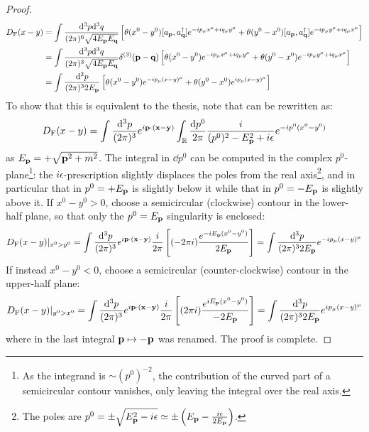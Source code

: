 \begin{proofbox}
\begin{proof}
    \begin{equation*}
      \begin{split}
        D_\text{F}(x-y)
        & = \int \frac{\mathrm{d}^3p \mathrm{d}^3q}{(2\pi)^6 \sqrt{4E_{\mathbf{p}}E_{\mathbf{q}}}} \left[ \theta(x^0 - y^0) [a_{\mathbf{p}} , a^\dagger_{\mathbf{q}}] e^{-i p_\mu x^\mu + i q_\mu y^\mu} + \theta(y^0 - x^0) [a_{\mathbf{p}} , a^\dagger_{\mathbf{q}}] e^{-i p_\mu y^\mu + i q_\mu x^\mu} \right] \\
        & = \int \frac{\mathrm{d}^3p \mathrm{d}^3q}{(2\pi)^3 \sqrt{4E_{\mathbf{p}}E_{\mathbf{q}}}} \delta^{(3)}(\mathbf{p} - \mathbf{q}) \left[ \theta(x^0 - y^0) e^{-i p_\mu x^\mu + i q_\mu y^\mu} + \theta(y^0 - x^0) e^{-i p_\mu y^\mu + i q_\mu x^\mu} \right] \\
        & = \int \frac{\mathrm{d}^3p}{(2\pi)^3 2E_{\mathbf{p}}} \left[ \theta(x^0 - y^0) e^{-i p_\mu (x-y)^\mu} + \theta(y^0 - x^0) e^{i p_\mu (x-y)^\mu} \right]
      \end{split}
    \end{equation*}
    To show that this is equivalent to the thesis, note that  can be rewritten as:
    \begin{equation*}
      D_\text{F}(x-y) = \int \frac{\mathrm{d}^3p}{(2\pi)^3} e^{i \mathbf{p} \cdot (\mathbf{x} - \mathbf{y})} \int_{\mathbb{R}} \frac{\mathrm{d} p^0}{2\pi} \frac{i}{(p^0)^2 - E_{\mathbf{p}}^2 + i\epsilon} e^{-i p^0 (x^0 - y^0)}
    \end{equation*}
    as $ E_{\mathbf{p}} = + \sqrt{\mathbf{p}^2 + m^2} $. The integral in $ \dd p^0 $ can be computed in the complex $ p^0 $-plane\footnote{As the integrand is $ \sim (p^0)^{-2} $, the contribution of the curved part of a semicircular contour vanishes, only leaving the integral over the real axis.}: the $ i\epsilon $-prescription slightly displaces the poles from the real axis\footnote{The poles are $ p^0 = \pm \sqrt{E_{\mathbf{p}}^2 - i\epsilon} \simeq \pm \left( E_{\mathbf{p}} - \frac{i\epsilon}{2E_{\mathbf{p}}} \right) $.}, and in particular that in $ p^0 = + E_{\mathbf{p}} $ is slightly below it while that in $ p^0 = - E_{\mathbf{p}} $ is slightly above it. If $ x^0 - y^0 > 0 $, choose a semicircular (clockwise) contour in the lower-half plane, so that only the $ p^0 = E_{\mathbf{p}} $ singularity is enclosed:
    \begin{equation*}
      D_\text{F}(x-y)\vert_{x^0 > y^0} = \int \frac{\mathrm{d}^3p}{(2\pi)^3} e^{i \mathbf{p} \cdot (\mathbf{x} - \mathbf{y})} \frac{i}{2\pi} \left[ (-2\pi i) \frac{e^{-i E_{\mathbf{p}} (x^0 - y^0)}}{2E_{\mathbf{p}}} \right] = \int \frac{\mathrm{d}^3p}{(2\pi)^3 2E_{\mathbf{p}}} e^{-i p_\mu (x-y)^\mu}
    \end{equation*}
    If instead $ x^0 - y^0 < 0 $, choose a semicircular (counter-clockwise) contour in the upper-half plane:
    \begin{equation*}
      D_\text{F}(x-y)\vert_{y^0 > x^0} = \int \frac{\mathrm{d}^3p}{(2\pi)^3} e^{i \mathbf{p} \cdot (\mathbf{x} - \mathbf{y})} \frac{i}{2\pi} \left[ (2\pi i) \frac{e^{i E_{\mathbf{p}} (x^0 - y^0)}}{-2E_{\mathbf{p}}} \right] = \int \frac{\mathrm{d}^3p}{(2\pi)^3 2E_{\mathbf{p}}} e^{i p_\mu (x-y)^\mu}
    \end{equation*}
    where in the last integral $ \mathbf{p} \mapsto -\mathbf{p} $ was renamed. The proof is complete.
  \end{proof}
\end{proofbox}

